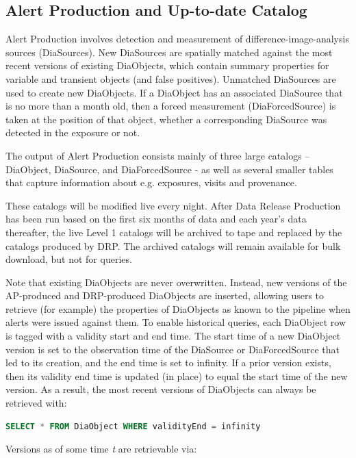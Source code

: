\documentclass[DM,lsstdraft,toc]{lsstdoc}
\begin{document}
\subsection{Alert Production and Up-to-date
Catalog}\label{alert-production-and-up-to-date-catalog}

Alert Production involves detection and measurement of
difference-image-analysis sources (DiaSources). New DiaSources are
spatially matched against the most recent versions of existing
DiaObjects, which contain summary properties for variable and transient
objects (and false positives). Unmatched DiaSources are used to create
new DiaObjects. If a DiaObject has an associated DiaSource that is no
more than a month old, then a forced measurement (DiaForcedSource) is
taken at the position of that object, whether a corresponding DiaSource
was detected in the exposure or not.

The output of Alert Production consists mainly of three large catalogs
-- DiaObject, DiaSource, and DiaForcedSource - as well as several
smaller tables that capture information about e.g. exposures, visits and
provenance.

These catalogs will be modified live every night. After Data Release
Production has been run based on the first six months of data and each
year's data thereafter, the live Level 1 catalogs will be archived to
tape and replaced by the catalogs produced by DRP. The archived catalogs
will remain available for bulk download, but not for queries.

Note that existing DiaObjects are never overwritten. Instead, new
versions of the AP-produced and DRP-produced DiaObjects are inserted,
allowing users to retrieve (for example) the properties of DiaObjects as
known to the pipeline when alerts were issued against them. To enable
historical queries, each DiaObject row is tagged with a validity start
and end time. The start time of a new DiaObject version is set to the
observation time of the DiaSource or DiaForcedSource that led to its
creation, and the end time is set to infinity. If a prior version
exists, then its validity end time is updated (in place) to equal the
start time of the new version. As a result, the most recent versions of
DiaObjects can always be retrieved with:

\begin{lstlisting}[language=SQL]
SELECT * FROM DiaObject WHERE validityEnd = infinity
\end{lstlisting}

Versions as of some time \emph{t} are retrievable via:
\end{document}
